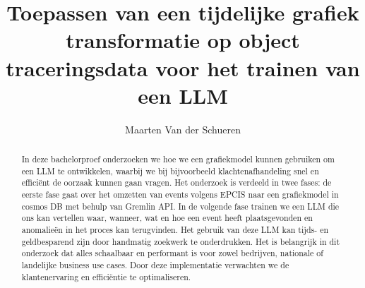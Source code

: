 \documentclass{hogent-article}
\title{Toepassen van een tijdelijke grafiek transformatie op object traceringsdata voor het trainen van een LLM}
\author{Maarten Van der Schueren}
\begin{document}
\begin{abstract}
In deze bachelorproef onderzoeken we hoe we een grafiekmodel kunnen gebruiken om een LLM te ontwikkelen, waarbij we bij bijvoorbeeld klachtenafhandeling snel en efficiënt de oorzaak kunnen gaan vragen.
Het onderzoek is verdeeld in twee fases: de eerste fase gaat over het omzetten van events volgens EPCIS naar een grafiekmodel in cosmos DB met behulp van Gremlin API.
In de volgende fase trainen we een LLM die ons kan vertellen waar, wanneer, wat en hoe een event heeft plaatsgevonden en anomalieën in het proces kan terugvinden.
Het gebruik van deze LLM kan tijds- en geldbesparend zijn door handmatig zoekwerk te onderdrukken. Het is belangrijk in dit onderzoek dat alles schaalbaar en performant is voor zowel bedrijven, nationale of landelijke business use cases.
Door deze implementatie verwachten we de klantenervaring en efficiëntie te optimaliseren.
\end{abstract}

\tableofcontents



\printbibliography[heading=bibintoc]
\end{document}
